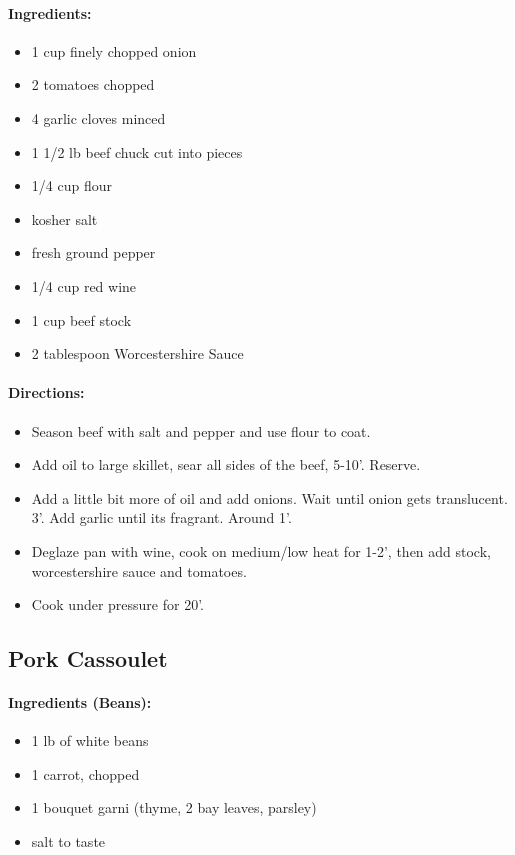 \documentclass{article}
\begin{document}
\paragraph{Ingredients:}
\begin{itemize}
    \item 1 cup finely chopped onion
    \item 2 tomatoes chopped
    \item 4 garlic cloves minced
    \item 1 1/2 lb beef chuck cut into pieces
    \item 1/4 cup flour
    \item kosher salt
    \item fresh ground pepper
    \item 1/4 cup red wine
    \item 1 cup beef stock
    \item 2 tablespoon Worcestershire Sauce
\end{itemize}

\paragraph{Directions:}
\begin{itemize}
    \item Season beef with salt and pepper and use flour to coat.
    \item Add oil to large skillet, sear all sides of the beef, 5-10’. Reserve.
    \item Add a little bit more of oil and add onions. Wait until onion gets translucent. 3’. Add garlic until its fragrant. Around 1’.
    \item Deglaze pan with wine, cook on medium/low heat for 1-2’, then add stock, worcestershire sauce and tomatoes.
    \item Cook under pressure for 20’.
\end{itemize}

\subsection{Pork Cassoulet} 

\paragraph{Ingredients (Beans):}
\begin{itemize}
    \item 1 lb of white beans
    \item 1 carrot, chopped
    \item 1 bouquet garni (thyme, 2 bay leaves, parsley)
    \item salt to taste
\end{itemize}  
\end{document}
